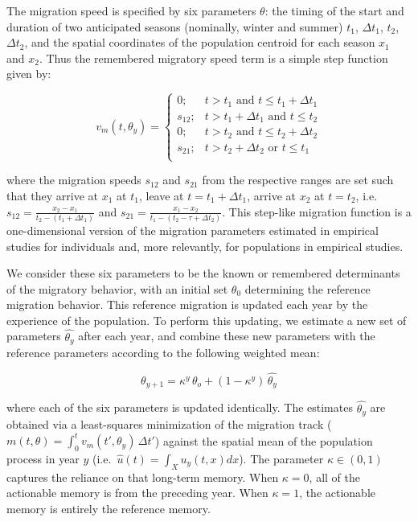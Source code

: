 \documentclass[utf8]{frontiersSCNS} %
\begin{document}
	The migration speed is specified by six parameters $\theta$: the timing of the start and duration of two anticipated seasons (nominally, winter and summer) $t_1$, $\Delta t_1$, $t_2$, $\Delta t_2$, and the spatial coordinates of the population centroid for each season $x_1$ and $x_2$. Thus the remembered migratory speed term is a simple step function given by:
	
	\begin{equation}
		v_m(t, \theta_y) = \begin{cases}
			0; & t > t_1  \,\, \text{and} \,\, t \leq t_1 + \Delta t_1 \\ 
			s_{12}; & t > t_1 + \Delta t_1 \,\, \text{and} \,\,  t \leq t_2 \\ 
			0; & t> t_2 \,\, \text{and} \,\, t \leq t_2 + \Delta t_2 \\ 
			s_{21}; &  t > t_2+\Delta t_2 \,\, \text{or} \,\, t \leq t_1\\ 
		\end{cases}
	\end{equation}
	
	\noindent where the migration speeds $s_{12}$ and $s_{21}$ from the respective ranges are set such that they arrive at $x_1$ at $t_1$, leave at $t = t_1 + \Delta t_1$, arrive at $x_2$ at $t = t_2$, i.e.~$s_{12} = \frac{x_2-x_1}{t_2 - (t_1 + \Delta t_1)}$ and $s_{21} = \frac{x_1-x_2}{t_1 - (t_2 - \tau + \Delta t_2)}$. This step-like migration function is a one-dimensional version of the migration parameters estimated in empirical studies for individuals \citep{Gurarie2017} and, more relevantly, for populations \citep{Gurarie2019} in empirical studies.
	
	We consider these six parameters to be the known or remembered determinants of the migratory behavior, with an initial set $\theta_0$ determining the reference migration behavior. This reference migration is updated each year by the experience of the population. To perform this updating, we estimate a new set of parameters $\widehat{\theta_y}$ after each year, and combine these new parameters with the reference parameters according to the following weighted mean:
	
	$$\theta_{y+1} = \kappa^y \, \theta_o + \left(1-\kappa^y\right)\,\widehat{\theta_y}$$ 
	
	\noindent where each of the six parameters is updated identically. The estimates $\widehat{\theta_y}$ are obtained via a least-squares minimization of the migration track ($m(t,\theta) = \int_0^t v_m(t',\theta_y) \, \Delta t'$) against the spatial mean of the population process in year $y$ (i.e.~$\widehat{u}(t) = \int_X u_y(t, x) dx$). The parameter $\kappa \in (0,1)$ captures the reliance on that long-term memory. When $\kappa = 0$, all of the actionable memory is from the preceding year. When $\kappa = 1$, the actionable memory is entirely the reference memory.
	
\end{document}
